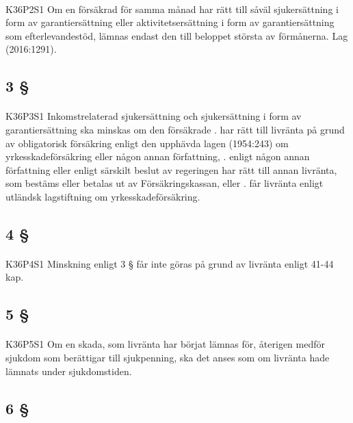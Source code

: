 \documentclass[a4paper,notitlepage,openany,10pt]{book}
\begin{document}
\paragraph*{}
{\tiny K36P2S1}
Om en försäkrad för samma månad har rätt till såväl sjukersättning i form av garantiersättning eller aktivitetsersättning i form av garantiersättning som efterlevandestöd, lämnas endast den till beloppet största av förmånerna.
Lag (2016:1291).
\subsection*{3 §}
\paragraph*{}
{\tiny K36P3S1}
Inkomstrelaterad sjukersättning och sjukersättning i form av garantiersättning ska minskas om den försäkrade
. har rätt till livränta på grund av obligatorisk försäkring enligt den upphävda lagen (1954:243) om yrkesskadeförsäkring eller någon annan författning,
. enligt någon annan författning eller enligt särskilt beslut av regeringen har rätt till annan livränta, som bestäms eller betalas ut av Försäkringskassan, eller
. får livränta enligt utländsk lagstiftning om yrkesskadeförsäkring.
\subsection*{4 §}
\paragraph*{}
{\tiny K36P4S1}
Minskning enligt 3 § får inte göras på grund av livränta enligt 41-44 kap.
\subsection*{5 §}
\paragraph*{}
{\tiny K36P5S1}
Om en skada, som livränta har börjat lämnas för, återigen medför sjukdom som berättigar till sjukpenning, ska det anses som om livränta hade lämnats under sjukdomstiden.
\subsection*{6 §}
\end{document}
